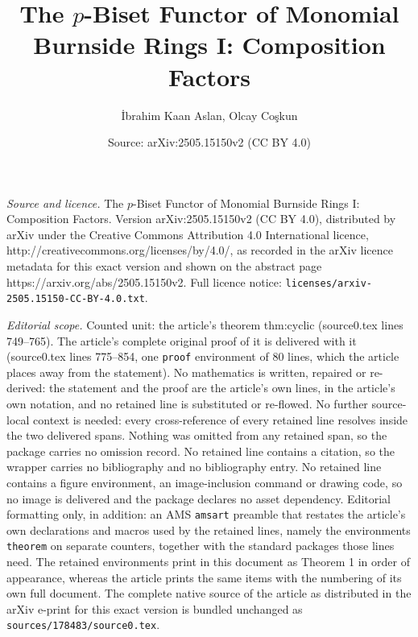 \documentclass[10pt,a4paper]{amsart}
\title{The $p$-Biset Functor of Monomial Burnside Rings I: Composition Factors}
\author{\.Ibrahim Kaan Aslan, Olcay Co\c{s}kun}
\date{Source: arXiv:2505.15150v2 (CC BY 4.0)}
\begin{document}
\maketitle

\noindent\emph{Source and licence.} The $p$-Biset Functor of Monomial Burnside Rings I: Composition Factors. Version arXiv:2505.15150v2 (CC BY 4.0), distributed by arXiv under the Creative Commons Attribution 4.0 International licence, http://creativecommons.org/licenses/by/4.0/, as recorded in the arXiv licence metadata for this exact version and shown on the abstract page https://arxiv.org/abs/2505.15150v2. Full licence notice: \texttt{licenses/arxiv-2505.15150-CC-BY-4.0.txt}.\par\smallskip

\noindent\textit{Editorial scope.} Counted unit: the article's theorem thm:cyclic (source0.tex lines 749--765). The article's complete original proof of it is delivered with it (source0.tex lines 775--854, one \texttt{proof} environment of 80 lines, which the article places away from the statement). No mathematics is written, repaired or re-derived: the statement and the proof are the article's own lines, in the article's own notation, and no retained line is substituted or re-flowed.  No further source-local context is needed: every cross-reference of every retained line resolves inside the two delivered spans.  Nothing was omitted from any retained span, so the package carries no omission record.  No retained line contains a citation, so the wrapper carries no bibliography and no bibliography entry.  No retained line contains a figure environment, an image-inclusion command or drawing code, so no image is delivered and the package declares no asset dependency.  Editorial formatting only, in addition: an AMS \texttt{amsart} preamble that restates the article's own declarations and macros used by the retained lines, namely the environments \texttt{theorem} on separate counters, together with the standard packages those lines need.  The retained environments print in this document as Theorem 1 in order of appearance, whereas the article prints the same items with the numbering of its own full document.  The complete native source of the article as distributed in the arXiv e-print for this exact version is bundled unchanged as \texttt{sources/178483/source0.tex}.
\end{document}
